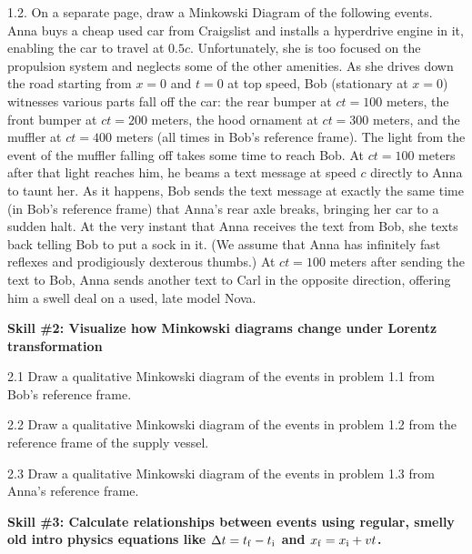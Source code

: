 1.2. On a separate page, draw a Minkowski Diagram of the following events.  Anna buys a cheap used car from Craigslist and installs a hyperdrive engine in it, enabling the car to travel at $0.5 c$.  Unfortunately, she is too focused on the propulsion system and neglects some of the other amenities.  
As she drives down the road starting from $x=0$ and $t=0$ at top speed, Bob (stationary at $x=0$) witnesses various parts fall off the car: 
the rear bumper at $ct=100$ meters, the front bumper at $ct=200$ meters, the hood ornament at $ct=300$ meters, and the muffler at $ct=400$ meters (all times in Bob's reference frame).  
The light from the event of the muffler falling off takes some time to reach Bob.  
At $ct=100$ meters after that light reaches him, he beams a text message at speed $c$ directly to Anna to taunt her.  As it happens, Bob sends the text message at exactly the same time (in Bob's reference frame) that Anna's rear axle breaks, bringing her car to a sudden halt.  At the very instant that Anna receives the text from Bob, she texts back telling Bob to put a sock in it.  (We assume that Anna has infinitely fast reflexes and prodigiously dexterous thumbs.)  
At $ct=100$ meters after sending the text to Bob, Anna sends another text to Carl in the opposite direction, offering him a swell deal on a used, late model Nova.  
\bigskip



\textbf{Skill \#2: Visualize how Minkowski diagrams change under Lorentz transformation}

2.1 Draw a qualitative Minkowski diagram of the events in problem 1.1 from Bob's reference frame.  
\bigskip

2.2 Draw a qualitative Minkowski diagram of the events in problem 1.2 from the reference frame of the supply vessel.  
\bigskip

2.3 Draw a qualitative Minkowski diagram of the events in problem 1.3 from Anna's reference frame.  
\bigskip

\pagebreak



\textbf{Skill \#3: Calculate relationships between events using regular, smelly old intro physics equations like \boldmath$ \Delta t=t_{\rm f}-t_{\rm i}$ and \boldmath${x_{\rm f}=x_{\rm i}+vt}$.}

